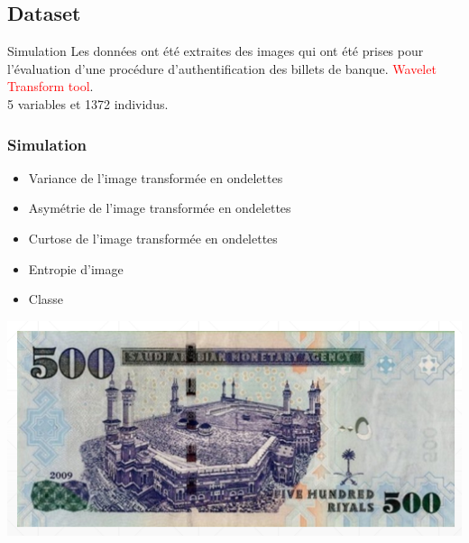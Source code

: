 \documentclass{bredelebeamer}
\begin{document}
 \subsection{Dataset}   
   \begin{frame}{Simulation}
 Les données ont été extraites des images qui ont été prises pour l'évaluation d'une procédure d'authentification des billets de banque. \textcolor{red}{Wavelet Transform tool}. \vspace{1\baselineskip}\\
 5 variables et 1372 individus.\vspace{1\baselineskip}\\
 \frametitle{Simulation }
\begin{minipage}{0.3\textwidth}
     \begin{itemize}
        \item Variance de l'image transformée en ondelettes\\

        \item Asymétrie de l'image transformée en ondelettes\\

        \item Curtose de l'image transformée en ondelettes\\
            \item Entropie d'image\\
            \item Classe \\
\end{itemize}
    \end{minipage}
    \begin{minipage}{0.3\textwidth}
    \includegraphics[scale=0.6]{20.png}
    \end{minipage}
 \end{frame}
\end{document}

